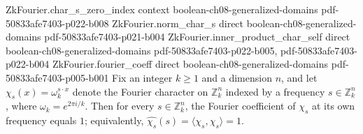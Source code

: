 \begin{lemma}
\proofstep
  {ZkFourier.char_s_zero_index}
  {context}
  {boolean-ch08-generalized-domains}
  {pdf-50833afe7403-p022-b008}
\proofstep
  {ZkFourier.norm_char_s}
  {direct}
  {boolean-ch08-generalized-domains}
  {pdf-50833afe7403-p021-b004}
\proofstep
  {ZkFourier.inner_product_char_self}
  {direct}
  {boolean-ch08-generalized-domains}
  {pdf-50833afe7403-p022-b005,
    pdf-50833afe7403-p022-b004}
\proofstep
  {ZkFourier.fourier_coeff}
  {direct}
  {boolean-ch08-generalized-domains}
  {pdf-50833afe7403-p005-b001}
Fix an integer $k \ge 1$ and a dimension $n$, and let $\chi_s(x) = \omega_k^{s \cdot x}$
denote the Fourier character on $\mathbb{Z}_k^n$ indexed by a frequency $s \in
\mathbb{Z}_k^n$, where $\omega_k = e^{2\pi i / k}$. Then for every $s \in
\mathbb{Z}_k^n$, the Fourier coefficient of $\chi_s$ at its own frequency equals $1$;
equivalently, $\widehat{\chi_s}(s) = \langle \chi_s, \chi_s \rangle = 1$.
\end{lemma}

